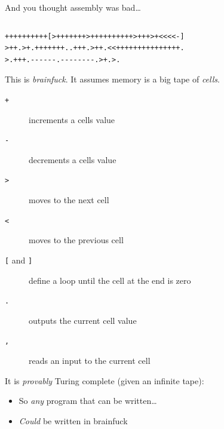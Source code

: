 \documentclass[9pt,aspectratio=169]{beamer}
\begin{document}
\begin{frame}[label={sec:org30a206b},fragile]{And you thought assembly was bad\ldots{}}
 \begin{columns}
\begin{column}[t]{0.79\columnwidth}
\begin{verbatim}
++++++++++[>+++++++>++++++++++>+++>+<<<<-]
>++.>+.+++++++..+++.>++.<<+++++++++++++++.
>.+++.------.--------.>+.>.
\end{verbatim}

This is \emph{brainfuck}.  It assumes memory is a big tape of \emph{cells}.
\begin{description}
\item[{\texttt{+}}] increments a cells value
\item[{\texttt{-}}] decrements a cells value
\item[{\texttt{>}}] moves to the next cell
\item[{\texttt{<}}] moves to the previous cell
\item[{\texttt{[} and \texttt{]}}] define a loop until the cell at the end is zero
\item[{\texttt{.}}] outputs the current cell value
\item[{\texttt{,}}] reads an input to the current cell
\end{description}

It is \emph{provably} Turing complete (given an infinite tape):
\begin{itemize}
\item So \emph{any} program that can be written\ldots{}
\item \emph{Could} be written in brainfuck
\end{itemize}
\end{column}


\end{columns}
\end{frame}
\end{document}
